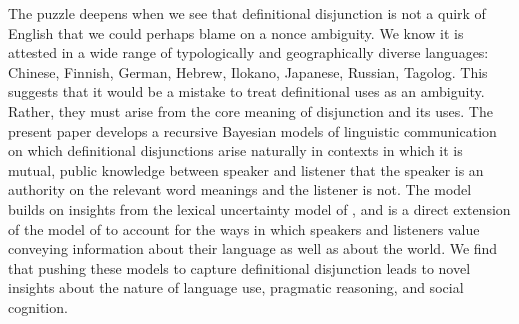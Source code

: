 The puzzle deepens when we see that definitional disjunction is not a
quirk of English that we could perhaps blame on a nonce ambiguity.  We
know it is attested in a wide range of typologically and
geographically diverse languages: Chinese, Finnish, German, Hebrew,
Ilokano, Japanese, Russian, Tagolog.  This suggests that it would be a
mistake to treat definitional uses as an ambiguity. Rather, they must
arise from the core meaning of disjunction and its uses.  The present
paper develops a recursive Bayesian models of linguistic communication
\cite{Franke09DISS,Jaeger:2011,Frank:Goodman:2012} on which
definitional disjunctions arise naturally in contexts in which it is
mutual, public knowledge between speaker and listener that the speaker
is an authority on the relevant word meanings and the listener is not.
The model builds on insights from the lexical uncertainty model of
\cite{Bergen:Goodman:Levy:2012}, and is a direct extension of the
model of \cite{Smith:Goodman:Frank:2013} to account for the ways in
which speakers and listeners value conveying information about their
language as well as about the world. We find that pushing these models
to capture definitional disjunction leads to novel insights about the
nature of language use, pragmatic reasoning, and social cognition.

%




















